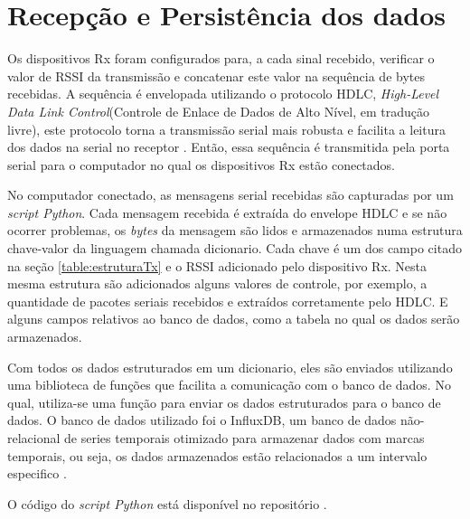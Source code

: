 \section{Recepção e Persistência dos dados}
Os dispositivos Rx foram configurados para, a cada sinal recebido, verificar o valor de RSSI da transmissão e concatenar este valor na sequência de bytes recebidas. A sequência é envelopada utilizando o protocolo HDLC, \emph{High-Level Data Link Control}(Controle de Enlace de Dados de Alto Nível, em tradução livre), este protocolo torna a transmissão serial mais robusta e facilita a leitura dos dados na serial no receptor \cite{tanembaum2011}. Então, essa sequência é transmitida pela porta serial para o computador no qual os dispositivos Rx estão conectados.

No computador conectado, as mensagens serial recebidas são capturadas por um \emph{script Python}. Cada mensagem recebida é extraída do envelope HDLC e se não ocorrer problemas, os \emph{bytes} da mensagem são lidos e armazenados numa estrutura chave-valor da linguagem chamada dicionario. Cada chave é um dos campo citado na seção \ref{table:estruturaTx} e o RSSI adicionado pelo dispositivo Rx. Nesta mesma estrutura são adicionados alguns valores de controle, por exemplo, a quantidade de pacotes seriais recebidos e extraídos corretamente pelo HDLC. E alguns campos relativos ao banco de dados, como a tabela no qual os dados serão armazenados.

Com todos os dados estruturados em um dicionario, eles são enviados utilizando uma biblioteca de funções que facilita a comunicação com o banco de dados. No qual, utiliza-se uma função para enviar os dados estruturados para o banco de dados. O banco de dados utilizado foi o InfluxDB, um banco de dados não-relacional de series temporais otimizado para armazenar dados com marcas temporais, ou seja, os dados armazenados estão relacionados a um intervalo especifico \cite{influxData}.

O código do \emph{script Python} está disponível no repositório \cite{openmoteb-serialReader}.


